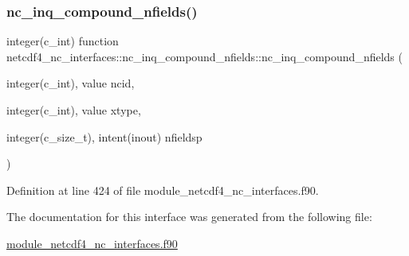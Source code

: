 \subsubsection{\texorpdfstring{nc\+\_\+inq\+\_\+compound\+\_\+nfields()}{nc\_inq\_compound\_nfields()}}
{\footnotesize\ttfamily integer(c\+\_\+int) function netcdf4\+\_\+nc\+\_\+interfaces\+::nc\+\_\+inq\+\_\+compound\+\_\+nfields\+::nc\+\_\+inq\+\_\+compound\+\_\+nfields (\begin{DoxyParamCaption}\item[{integer(c\+\_\+int), value}]{ncid,  }\item[{integer(c\+\_\+int), value}]{xtype,  }\item[{integer(c\+\_\+size\+\_\+t), intent(inout)}]{nfieldsp }\end{DoxyParamCaption})}



Definition at line 424 of file module\+\_\+netcdf4\+\_\+nc\+\_\+interfaces.\+f90.



The documentation for this interface was generated from the following file\+:\begin{DoxyCompactItemize}
\item 
\hyperlink{module__netcdf4__nc__interfaces_8f90}{module\+\_\+netcdf4\+\_\+nc\+\_\+interfaces.\+f90}\end{DoxyCompactItemize}
